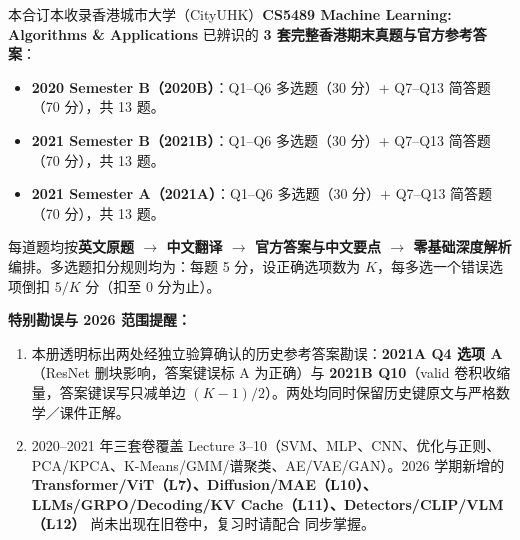 \newcommand{\StudyBook}{CS5489-Final}
\newcommand{\StudyRoot}{../../..}

\renewcommand{\StudySourceRef}{CS5489-Final-3Papers}
\renewcommand{\StudyDate}{2026-11-26}


\tableofcontents


本合订本收录香港城市大学（CityUHK）\textbf{CS5489 Machine Learning: Algorithms \& Applications} 已辨识的 \textbf{3 套完整香港期末真题与官方参考答案}：
\begin{itemize}
\item \textbf{2020 Semester B（2020B）}：Q1–Q6 多选题（30 分）+ Q7–Q13 简答题（70 分），共 13 题。
\item \textbf{2021 Semester B（2021B）}：Q1–Q6 多选题（30 分）+ Q7–Q13 简答题（70 分），共 13 题。
\item \textbf{2021 Semester A（2021A）}：Q1–Q6 多选题（30 分）+ Q7–Q13 简答题（70 分），共 13 题。
\end{itemize}
每道题均按\textbf{英文原题 \ensuremath{\to} 中文翻译 \ensuremath{\to} 官方答案与中文要点 \ensuremath{\to} 零基础深度解析}编排。多选题扣分规则均为：每题 5 分，设正确选项数为 $K$，每多选一个错误选项倒扣 $5/K$ 分（扣至 0 分为止）。

\textbf{特别勘误与 2026 范围提醒：}
\begin{enumerate}
\item 本册透明标出两处经独立验算确认的历史参考答案勘误：\textbf{2021A Q4 选项 A}（ResNet 删块影响，答案键误标 A 为正确）与 \textbf{2021B Q10}（valid 卷积收缩量，答案键误写只减单边 $(K-1)/2$）。两处均同时保留历史键原文与严格数学／课件正解。
\item 2020–2021 年三套卷覆盖 Lecture 3–10（SVM、MLP、CNN、优化与正则、PCA/KPCA、K-Means/GMM/谱聚类、AE/VAE/GAN）。2026 学期新增的 \textbf{Transformer/ViT（L7）、Diffusion/MAE（L10）、LLMs/GRPO/Decoding/KV Cache（L11）、Detectors/CLIP/VLM（L12）} 尚未出现在旧卷中，复习时请配合  同步掌握。
\end{enumerate}

